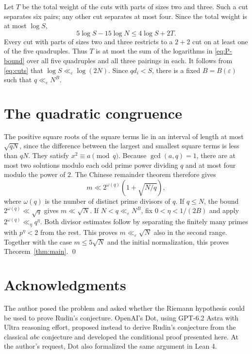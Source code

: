 \documentclass[11pt,reqno]{amsart}
\begin{document}
Let $T$ be the total weight of the cuts with parts of sizes two and
three. Such a cut separates six pairs; any other cut separates at
most four. Since the total weight is at most $\log S$,
\begin{equation}\label{eq:cuts}
 5\log S-15\log N\le 4\log S+2T.
\end{equation}
Every cut with parts of sizes two and three restricts to a $2+2$ cut
on at least one of the five quadruples. Thus $T$ is at most the sum
of the logarithms in \eqref{eq:P-bound} over all five quadruples
and all three pairings in each. It follows from \eqref{eq:cuts} that
$\log S\ll_\varepsilon\log(2N)$. Since $qd_i<S$, there is a fixed
$B=B(\varepsilon)$ such that $q\ll_\varepsilon N^B$.

\section{The quadratic congruence}

The positive square roots of the square terms lie in an interval of length
at most $\sqrt{qN}$, since the difference between the largest and smallest
square terms is less than $qN$. They satisfy $x^2\equiv a\pmod q$.
Because $\gcd(a,q)=1$, there are at most two solutions modulo each odd
prime power dividing $q$ and at most four modulo the power of $2$.
The Chinese remainder theorem therefore gives
\[
 m\ll 2^{\omega(q)}\left(1+\sqrt{N/q}\right),
\]
where $\omega(q)$ is the number of distinct prime divisors of $q$.
If $q\le N$, the bound $2^{\omega(q)}\ll\sqrt q$ gives
$m\ll\sqrt N$. If $N<q\ll_\varepsilon N^B$, fix
$0<\eta<1/(2B)$ and apply $2^{\omega(q)}\ll_\eta q^\eta$.
Both divisor estimates follow by separating the finitely many primes
with $p^\eta<2$ from the rest. This proves $m\ll_\varepsilon\sqrt N$
also in the second range. Together with the case $m\le5\sqrt N$ and
the initial normalization, this proves Theorem~\ref{thm:main}.
\qed

\section*{Acknowledgments}
The author posed the problem and asked whether the Riemann hypothesis
could be used to prove Rudin's conjecture. OpenAI's Dot, using GPT-6.2
Astra with Ultra reasoning effort, proposed instead to derive Rudin's
conjecture from the classical \(abc\) conjecture and developed the
conditional proof presented here. At the author's request, Dot also
formalized the same argument in Lean 4.



\end{document}
